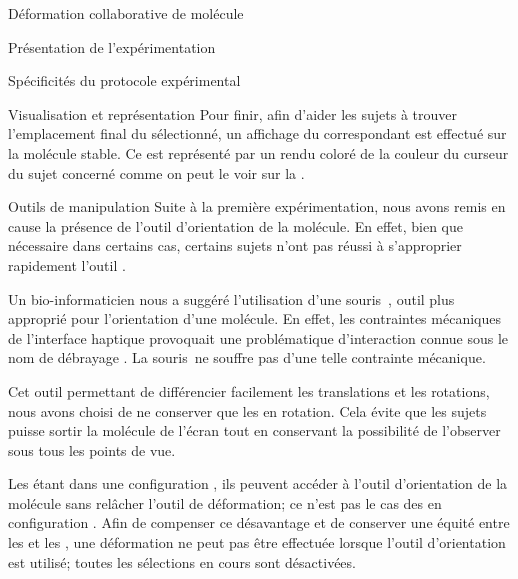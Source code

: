 \documentclass[myfrancais,ngerman,english,french]{mythesis}
\begin{document}
\begin{mychapter}{Déformation collaborative de molécule}
\begin{mysection}{Présentation de l'expérimentation}
\begin{mysubsection}{Spécificités du protocole expérimental}
\begin{mysubsubsection}{Visualisation et représentation}
					Pour finir, afin d'aider les sujets à trouver l'emplacement final du  sélectionné, un affichage du  correspondant est effectué sur la molécule stable.
					Ce  est représenté par un rendu \myCPK coloré de la couleur du curseur du sujet concerné comme on peut le voir sur la .
				\end{mysubsubsection}
				\begin{mysubsubsection}{Outils de manipulation}
					Suite à la première expérimentation, nous avons remis en cause la présence de l'outil d'orientation de la molécule.
					En effet, bien que nécessaire dans certains cas, certains sujets n'ont pas réussi à s'approprier rapidement l'outil .

					Un bio-informaticien nous a suggéré l'utilisation d'une souris~\myThreeD, outil plus approprié pour l'orientation d'une molécule.
					En effet, les contraintes mécaniques de l'interface haptique provoquait une problématique d'interaction connue sous le nom de débrayage .
					La souris~\myThreeD ne souffre pas d'une telle contrainte mécanique.

					Cet outil permettant de différencier facilement les translations et les rotations, nous avons choisi de ne conserver que les  en rotation.
					Cela évite que les sujets puisse sortir la molécule de l'écran tout en conservant la possibilité de l'observer sous tous les points de vue.

					Les  étant dans une configuration , ils peuvent accéder à l'outil d'orientation de la molécule sans relâcher l'outil de déformation; ce n'est pas le cas des  en configuration .
					Afin de compenser ce désavantage et de conserver une équité entre les  et les , une déformation ne peut pas être effectuée lorsque l'outil d'orientation est utilisé; toutes les sélections en cours sont désactivées.


\end{mysubsubsection}
\end{mysubsection}
\end{mysection}
\end{mychapter}
\end{document}
